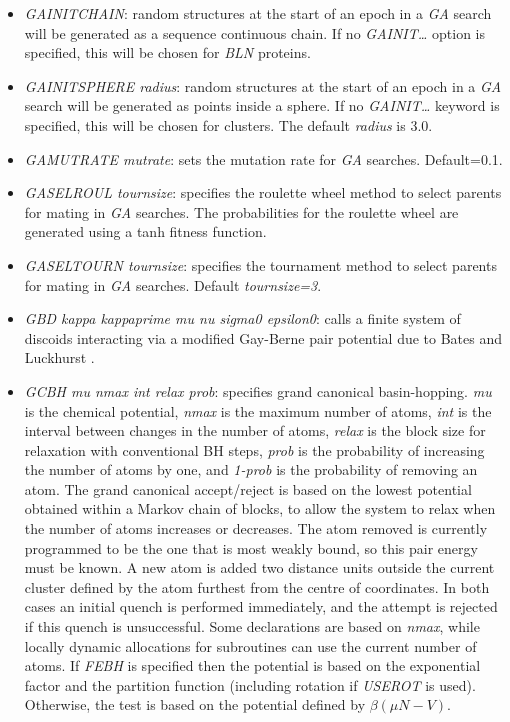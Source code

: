 \documentclass[12pt,a4paper,dvips]{article}
\begin{document}
\begin{itemize}
\item {\it GAINITCHAIN\/}: random structures at the start of an epoch
in a {\it GA} search will be generated as a sequence continuous chain. If
no {\it GAINIT\ldots} option is specified, this will be chosen for {\it BLN}
proteins.

\item {\it GAINITSPHERE radius\/}: random structures at the start of an epoch
in a {\it GA} search will be generated as points inside a sphere.  If
no {\it GAINIT\ldots} keyword is specified, this will be chosen for clusters.
The default {\it radius\/} is 3.0.

\item {\it GAMUTRATE mutrate\/}: sets the mutation rate for {\it GA}
searches. Default=0.1.

\item {\it GASELROUL tournsize\/}: specifies the roulette wheel method to select
parents for mating in {\it GA} searches. The probabilities for the roulette
wheel are generated using a tanh fitness function.

\item {\it GASELTOURN tournsize\/}: specifies the tournament method to select
parents for mating in {\it GA} searches. Default {\it tournsize=3\/}.

\item {\it GBD kappa kappaprime mu nu sigma0 epsilon0\/}: calls a finite system of discoids
interacting via a modified Gay-Berne pair potential due to Bates and Luckhurst \cite{BatesL96}.

\item {\it GCBH mu nmax int relax prob}: specifies grand canonical basin-hopping.
{\it mu} is the chemical potential, {\it nmax} is the maximum number of atoms, 
{\it int} is the interval between changes in the number of atoms,
{\it relax} is the block size for relaxation with conventional BH steps,
{\it prob} is the probability of increasing the number of atoms by one,
and {\it 1-prob} is the probability of removing an atom.
The grand canonical accept/reject is based on the lowest potential obtained within
a Markov chain of blocks, to allow the system to relax when the number of atoms
increases or decreases.
The atom removed is currently programmed to be the one that is most weakly bound, so
this pair energy must be known.
A new atom is added two distance units outside the current cluster defined
by the atom furthest from the centre of coordinates.
In both cases an initial quench is performed immediately, and the attempt is rejected
if this quench is unsuccessful.
Some declarations are based on {\it nmax}, while locally dynamic allocations 
for subroutines can use the current number of atoms.
If {\it FEBH} is specified then the potential is based on the exponential factor
and the partition function (including rotation if {\it USEROT} is used).
Otherwise, the test is based on the potential defined by $\beta(\mu N-V)$.


\end{itemize}
\end{document}
